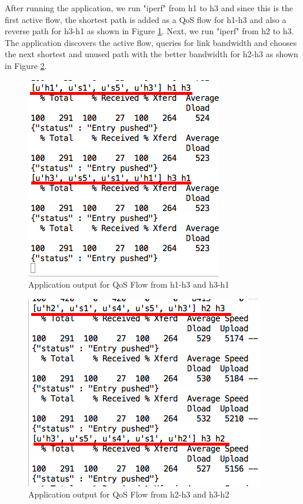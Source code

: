 \documentclass[paper=a4, fontsize=12pt]{scrartcl}	%
\numberwithin{equation}{section}		%
\numberwithin{figure}{section}			%
\numberwithin{table}{section}				%
\begin{document}
After running the application, we run "iperf" from h1 to h3 and since this is the first active flow, the shortest path is added as a QoS flow for h1-h3 and also a reverse path for h3-h1 as shown in Figure \ref{Outh1h3}. Next, we run "iperf"  from h2 to h3. The application discovers the active flow, queries for link bandwidth and chooses the next shortest and unused path with the better bandwidth for h2-h3 as shown in Figure \ref{Outh2h3}.
\begin{figure}[H]
\begin{center}
\includegraphics[scale=0.45]{h1-h3.png}   
\end{center}
 \caption{Application output for QoS Flow from h1-h3 and h3-h1}
 \label{Outh1h3}
\end{figure}
\begin{figure}[H]
\begin{center}
\includegraphics[scale=0.45]{h2-h3.png}   
\end{center}
 \caption{Application output for QoS Flow from h2-h3 and h3-h2}
 \label{Outh2h3}
\end{figure}
\end{document}
